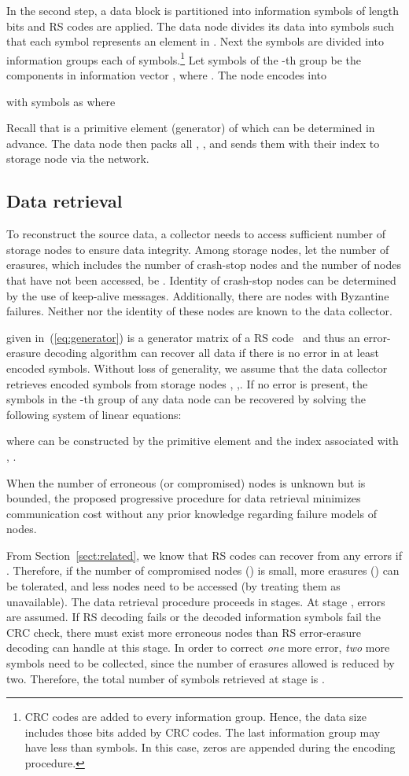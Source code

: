 \documentclass[10pt,journal,letterpaper,compsoc]{IEEEtran}
\newcommand{\0}{{\bf 0}}
\newcounter{step}
\begin{document}
In the second step, a data block is partitioned into information symbols of
length  bits and RS codes are applied. The data node divides its
data into  symbols such
that each symbol represents an element in . Next 
the  symbols are divided into  information groups each of 
symbols.\footnote{CRC codes are added to every information group. Hence, the data size  includes those bits added by CRC codes. The last information group may have less than  symbols.
In this case, zeros are appended during the encoding procedure.} Let
 symbols of the -th group be the
components in information vector
,
where .   The node encodes  into

with  symbols as 
where 

Recall that  is a primitive element (generator) of  which can be
determined in advance. The data node then packs all , , and sends them with
their index  to storage node  via the network. 
\subsection{Data retrieval}
To reconstruct the source data, a collector needs to access sufficient number
of storage nodes to ensure data integrity. Among  storage nodes, let the
number of erasures, which includes the number of crash-stop nodes and the
number of nodes that have not been accessed, be . Identity of crash-stop
nodes can be determined by the use of keep-alive messages.  Additionally, there
are  nodes with Byzantine failures. Neither  nor the identity of these
nodes are known to the data collector. 

 given in~(\ref{eq:generator}) is a generator
matrix of a RS code~\cite{MOO05} and thus an error-erasure decoding algorithm
can recover all data if there is no error in at least  encoded symbols.  Without loss
of generality, we assume that the data collector retrieves encoded symbols from
storage nodes , ,. If no error is
present, the  symbols in the -th group of any data node can be
recovered by solving the following system of linear equations:

where
  can be constructed by the primitive element
and the index associated with , .  

When the number of erroneous (or compromised) nodes is unknown but is bounded, the
proposed progressive  procedure for data retrieval
minimizes communication cost without any prior knowledge regarding
failure models of nodes.

From Section~\ref{sect:related}, we know that RS codes can recover from any  errors if
. Therefore, if the number of compromised
nodes () is small, more erasures () can be tolerated, and less nodes need
to be accessed (by treating them as unavailable). The data retrieval procedure
proceeds in stages. At stage ,  errors are assumed. If RS decoding fails
or the decoded information symbols fail the CRC check, there must exist more
erroneous nodes than RS error-erasure decoding can handle at this stage. In
order to correct {\it one} more error, {\it two} more symbols need to be collected,
since the number of erasures allowed is reduced by two. Therefore, the total
number of symbols retrieved at stage  is . 
\end{document}
